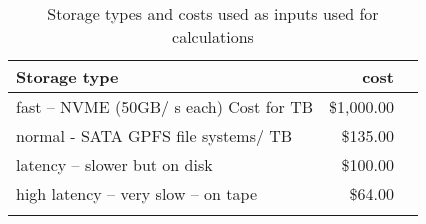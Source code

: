 \tiny \begin{longtable} { |p{}  |r  |r |} 
\caption{Storage types and costs used as inputs used for calculations \label{tab:Storage}}\\ 
\hline 
{Storage type }&{cost} \\ \hline
{fast -- NVME (50GB/ s each) Cost for TB  }&{\$1,000.00} \\ \hline
{normal - SATA GPFS file systems/ TB  }&{\$135.00} \\ \hline
{latency -- slower but on disk }&{\$100.00} \\ \hline
{high latency -- very slow -- on tape }&{\$64.00} \\ \hline
{}&{} \\ \hline
\end{longtable} \normalsize
